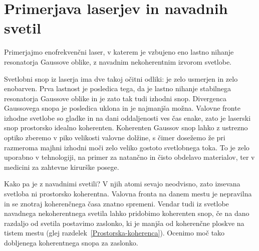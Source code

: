 \section{Primerjava laserjev in navadnih svetil}
Primerjajmo enofrekvenčni laser, v katerem je vzbujeno eno lastno nihanje
resonatorja Gaussove oblike, z navadnim nekoherentnim izvorom svetlobe.

Svetlobni snop iz laserja ima dve takoj očitni odliki: je zelo
usmerjen in zelo enobarven. Prva lastnost je posledica tega, da je
lastno nihanje stabilnega resonatorja Gaussove oblike in je zato tak tudi
izhodni snop. Divergenca Gaussovega snopa je posledica uklona in je 
najmanjša možna. Valovne fronte izhodne svetlobe so gladke in na dani oddaljenosti ves 
čas enake, zato je laserski snop prostorsko idealno koherenten. 
Koherenten Gaussov snop lahko z ustrezno optiko zberemo v piko velikosti
valovne dolžine, s čimer dosežemo že pri razmeroma majhni izhodni moči zelo veliko
gostoto svetlobnega toka. To je zelo uporabno v tehnologiji, na primer za natančno in
čisto obdelavo materialov, ter v medicini za
zahtevne kirurške posege.

Kako pa je z navadnimi svetili? V njih atomi sevajo neodvisno, zato
izsevana svetloba ni prostorsko koherentna. Valovna fronta na danem 
mestu je nepravilna in se znotraj koherenčnega časa znatno spremeni. 
Vendar tudi iz svetlobe navadnega nekoherentnega svetila lahko pridobimo
koherenten snop, če na dano razdaljo od svetila postavimo zaslonko, ki
je manjša od koherenčne ploskve na tistem mestu (glej 
razdelek~\ref{Prostorska-koherenca}). Ocenimo moč tako dobljenega
koherentnega snopa za zaslonko.

